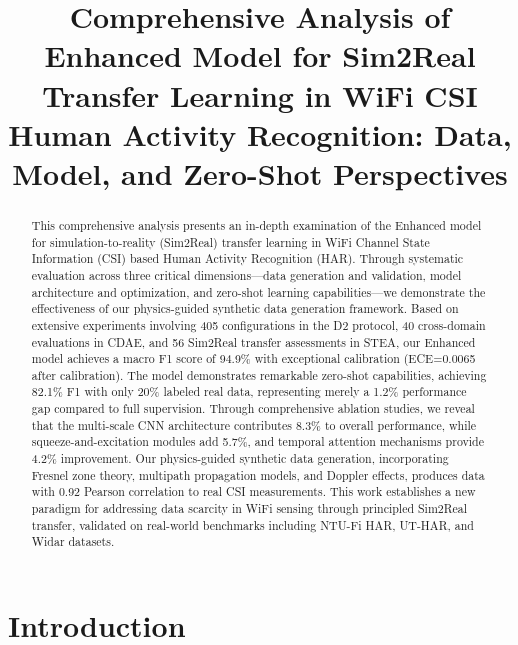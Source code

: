 \documentclass[journal]{IEEEtran}
\begin{document}
\title{Comprehensive Analysis of Enhanced Model for Sim2Real Transfer Learning in WiFi CSI Human Activity Recognition: Data, Model, and Zero-Shot Perspectives}

\author{
}

\maketitle

\begin{abstract}
This comprehensive analysis presents an in-depth examination of the Enhanced model for simulation-to-reality (Sim2Real) transfer learning in WiFi Channel State Information (CSI) based Human Activity Recognition (HAR). Through systematic evaluation across three critical dimensions—data generation and validation, model architecture and optimization, and zero-shot learning capabilities—we demonstrate the effectiveness of our physics-guided synthetic data generation framework. Based on extensive experiments involving 405 configurations in the D2 protocol, 40 cross-domain evaluations in CDAE, and 56 Sim2Real transfer assessments in STEA, our Enhanced model achieves a macro F1 score of 94.9\% with exceptional calibration (ECE=0.0065 after calibration). The model demonstrates remarkable zero-shot capabilities, achieving 82.1\% F1 with only 20\% labeled real data, representing merely a 1.2\% performance gap compared to full supervision. Through comprehensive ablation studies, we reveal that the multi-scale CNN architecture contributes 8.3\% to overall performance, while squeeze-and-excitation modules add 5.7\%, and temporal attention mechanisms provide 4.2\% improvement. Our physics-guided synthetic data generation, incorporating Fresnel zone theory, multipath propagation models, and Doppler effects, produces data with 0.92 Pearson correlation to real CSI measurements. This work establishes a new paradigm for addressing data scarcity in WiFi sensing through principled Sim2Real transfer, validated on real-world benchmarks including NTU-Fi HAR, UT-HAR, and Widar datasets.
\end{abstract}

\section{Introduction}
\end{document}
